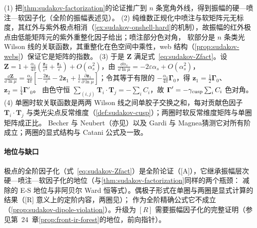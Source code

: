 \begin{proofsketch}
(1) 把\cref{thm:sudakov-factorization}的论证推广到 $n$ 条宽角外线，得到振幅的硬—喷注—软因子化\cite{Sen1983}（全阶的振幅表述见\cite{FeigeSchwartz2014,Ma2020}）。
(2) 纯维数正规化中喷注与软矩阵元无标度，其红外与紫外极点相消（\cref{ex:sudakov-onshell-hard}的机制），故振幅的红外极点由低能矩阵元的紫外重整化因子给出；喷注部分色对角，
软部分是 $n$ 条类光 Wilson 线的关联函数，其重整化在色空间中乘性，web 结构（\cref{prop:sudakov-webs}）保证它是矩阵的指数\cite{Becher:2009cu,Becher:2009qa,DixonMagneaSterman2008}。
(3) 于是 $\mathbf Z$ 满足式~\eqref{eq:sudakov-Zfact}。设 $\mathbf Z=1+\frac{\alpha_s}{4\pi}(\frac{\mathbf z_2}{\varepsilon^2}+\frac{\mathbf z_1}{\varepsilon})+O(\alpha_s^2)$，由 $\frac{\dd\alpha_s}{\dd\ln\mu}=-2\varepsilon\alpha_s+O(\alpha_s^2)$，
$\frac{\dd\mathbf Z}{\dd\ln\mu}=\frac{\alpha_s}{4\pi}[-\frac{2\mathbf z_2}{\varepsilon}-2\mathbf z_1+\frac1\varepsilon\frac{\partial\mathbf z_1}{\partial\ln\mu}]$；令其等于有限的 $-\frac{\alpha_s}{4\pi}\boldsymbol\Gamma_0$，得 $\mathbf z_1=\frac12\boldsymbol\Gamma_0$、$\mathbf z_2=\frac14\boldsymbol\Gamma'_0$。
由色守恒 $\sum_{(i,j)}\mathbf T_i\cdot\mathbf T_j=-\sum_iC_i$，故 $\boldsymbol\Gamma'=-\gamma_{\rm cusp}\sum_iC_i$ 色对角。
(4) 单圈时软关联函数是两两 Wilson 线之间单胶子交换之和，每对贡献色因子 $\mathbf T_i\cdot\mathbf T_j$ 与类光尖点反常维度（\cref{def:sudakov-cusp}）；两圈时软反常维度矩阵与单圈矩阵成正比\cite{Aybat:2006mz}。
Becher 与 Neubert\cite[式~(7)]{Becher:2009cu}（亦见\cite[式~(7)]{Becher:2009qa}）以及 Gardi 与 Magnea\cite{Gardi:2009qi}猜测它对所有阶成立；两圈的显式结构与 Catani 公式\cite{Catani:1998bh}及\cite{Sterman:2002qn}一致。
\end{proofsketch}

\paragraph{地位与缺口}极点的全阶因子化（式~\eqref{eq:sudakov-Zfact}）是全阶论证（[A]），它继承振幅层次硬—喷注—软因子化的地位（与\cref{thm:sudakov-factorization}同样的两个瓶颈：
减除的 E-S 地位与非阿贝尔 Ward 恒等式）。偶极子形式在单圈与两圈是显式计算的结果（[R] 意义上的定阶内容，两圈见\cite{Aybat:2006mz}）；
作为全阶精确公式它不成立（\cref{prop:sudakov-dipole-violation}）。升级为 $[R]$ 需要振幅因子化的完整证明（参见第~24~章\cref{prop:front-ir-forest}的地位，前向指针）。

